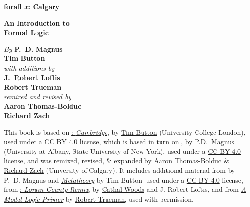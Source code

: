 
\ifHTMLtarget\else

\pagestyle{empty}

\vspace*{80pt}

\begin{raggedleft}
\fontsize{30pt}{24pt}\sffamily
\selectfont
  \textbf{forall 
  {\fontsize{37pt}{24pt}\selectfont\rmfamily\textit{x}}: 
  Calgary}

\medskip\fontsize{18pt}{20pt}\selectfont

\textbf{An Introduction to\\ Formal Logic}

\vfill
\fontsize{12pt}{16pt}\selectfont \textit{By } \textbf{P.~D. Magnus}\\
\textbf{Tim Button}\\
\textit{with additions by}\\
\textbf{J.~Robert Loftis}\\
\textbf{Robert Trueman}\\
\textit{remixed and revised by}\\
\textbf{Aaron Thomas-Bolduc}\\ \textbf{Richard Zach}

\vfill
\textbf{\forallxversion}\par
\end{raggedleft}

\newpage

\noindent\small%
\fi
This book is based on
\href{https://www.homepages.ucl.ac.uk/~uctytbu/OERs.html}{\forallx:
\textit{Cambridge}}, by 
\href{https://www.homepages.ucl.ac.uk/~uctytbu/}{Tim Button} (University College London), 
used under a \href{https://creativecommons.org/licenses/by/4.0/}{CC BY
4.0} license, which is based in turn
on \href{https://www.fecundity.com/logic/}{\forallx}, by
\href{https://www.fecundity.com/job/}{P.D.\ Magnus} 
(University at Albany, State University of New York),
used under a \href{https://creativecommons.org/licenses/by/4.0/}{CC BY
4.0} license, 
and was remixed, revised, \& expanded by Aaron
Thomas-Bolduc \& \href{https://richardzach.org/}{Richard Zach}
(University of Calgary).
It includes additional material from \forallx{} by P.~D. Magnus and
\href{https://www.homepages.ucl.ac.uk/~uctytbu/OERs.html}{\textit{Metatheory}} by Tim Button, 
used under a \href{https://creativecommons.org/licenses/by/4.0/}{CC BY
4.0} license, 
from \href{https://github.com/rob-helpy-chalk/openintroduction}{\forallx: \textit{Lorain
County Remix}},
by \href{https://sites.google.com/site/cathalwoods/}{Cathal Woods} and
J. Robert Loftis, and from \href{http://www.rtrueman.com/uploads/7/0/3/2/70324387/modal_logic_primer.pdf}{\textit{A Modal Logic Primer}} by \href{http://www.rtrueman.com/}{Robert Trueman}, used with permission.



